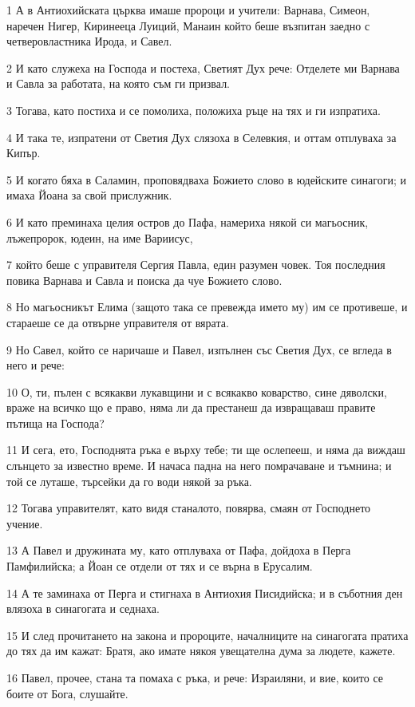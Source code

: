 \par 1 А в Антиохийската църква имаше пророци и учители: Варнава, Симеон, наречен Нигер, Киринееца Луиций, Манаин който беше възпитан заедно с четверовластника Ирода, и Савел.
\par 2 И като служеха на Господа и постеха, Светият Дух рече: Отделете ми Варнава и Савла за работата, на която съм ги призвал.
\par 3 Тогава, като постиха и се помолиха, положиха ръце на тях и ги изпратиха.
\par 4 И така те, изпратени от Светия Дух слязоха в Селевкия, и оттам отплуваха за Кипър.
\par 5 И когато бяха в Саламин, проповядваха Божието слово в юдейските синагоги; и имаха Йоана за свой прислужник.
\par 6 И като преминаха целия остров до Пафа, намериха някой си магьосник, лъжепророк, юдеин, на име Вариисус,
\par 7 който беше с управителя Сергия Павла, един разумен човек. Тоя последния повика Варнава и Савла и поиска да чуе Божието слово.
\par 8 Но магьосникът Елима (защото така се превежда името му) им се противеше, и стараеше се да отвърне управителя от вярата.
\par 9 Но Савел, който се наричаше и Павел, изпълнен със Светия Дух, се вгледа в него и рече:
\par 10 О, ти, пълен с всякакви лукавщини и с всякакво коварство, сине дяволски, враже на всичко що е право, няма ли да престанеш да извращаваш правите пътища на Господа?
\par 11 И сега, ето, Господнята ръка е върху тебе; ти ще ослепееш, и няма да виждаш слънцето за известно време. И начаса падна на него помрачаване и тъмнина; и той се луташе, търсейки да го води някой за ръка.
\par 12 Тогава управителят, като видя станалото, повярва, смаян от Господнето учение.
\par 13 А Павел и дружината му, като отплуваха от Пафа, дойдоха в Перга Памфилийска; а Йоан се отдели от тях и се върна в Ерусалим.
\par 14 А те заминаха от Перга и стигнаха в Антиохия Писидийска; и в съботния ден влязоха в синагогата и седнаха.
\par 15 И след прочитането на закона и пророците, началниците на синагогата пратиха до тях да им кажат: Братя, ако имате някоя увещателна дума за людете, кажете.
\par 16 Павел, прочее, стана та помаха с ръка, и рече: Израиляни, и вие, които се боите от Бога, слушайте.
